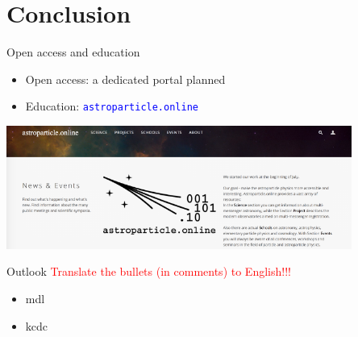 \section{Conclusion}

\begin{frame}{Open access and education}
    \vspace{-4em}
    \begin{itemize}
        \item Open access: a dedicated portal planned
        \item Education: \textcolor{blue}{\texttt{astroparticle.online}}
    \end{itemize}
    \centering
    \includegraphics[width=0.85\textwidth]{pics/astro_onl.png}
\end{frame}

\begin{frame}{Outlook}
\textcolor{red}{Translate the bullets (in comments) to English!!!}
    \begin{itemize}
    \item mdl
    \item kcdc



    \end{itemize}
\end{frame}

